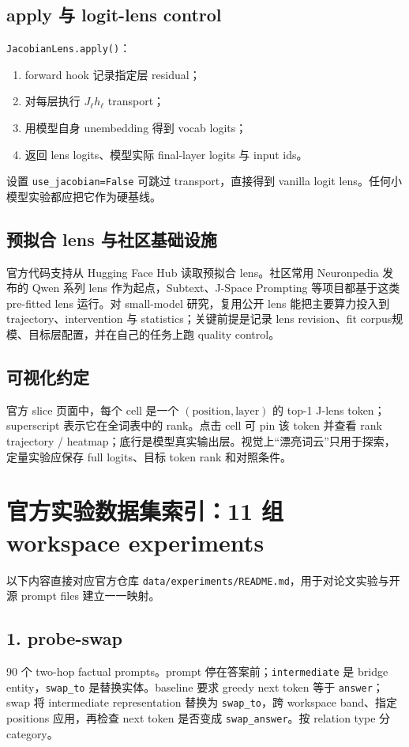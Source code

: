 \documentclass[10.5pt,a4paper]{ctexart}
\begin{document}
\subsection{apply 与 logit-lens control}
\texttt{JacobianLens.apply()}：
\begin{enumerate}
  \item forward hook 记录指定层 residual；
  \item 对每层执行 \(J_\ell h_\ell\) transport；
  \item 用模型自身 unembedding 得到 vocab logits；
  \item 返回 lens logits、模型实际 final-layer logits 与 input ids。
\end{enumerate}
设置 \texttt{use\_jacobian=False} 可跳过 transport，直接得到 vanilla logit lens。任何小模型实验都应把它作为硬基线。


\subsection{预拟合 lens 与社区基础设施}
官方代码支持从 Hugging Face Hub 读取预拟合 lens。社区常用 Neuronpedia 发布的 Qwen 系列 lens 作为起点，Subtext、J-Space Prompting 等项目都基于这类 pre-fitted lens 运行。对 small-model 研究，复用公开 lens 能把主要算力投入到 trajectory、intervention 与 statistics；关键前提是记录 lens revision、fit corpus规模、目标层配置，并在自己的任务上跑 quality control。

\subsection{可视化约定}
官方 slice 页面中，每个 cell 是一个 \((\mathrm{position},\mathrm{layer})\) 的 top-1 J-lens token；superscript 表示它在全词表中的 rank。点击 cell 可 pin 该 token 并查看 rank trajectory / heatmap；底行是模型真实输出层。视觉上“漂亮词云”只用于探索，定量实验应保存 full logits、目标 token rank 和对照条件。

\section{官方实验数据集索引：11 组 workspace experiments}
以下内容直接对应官方仓库 \texttt{data/experiments/README.md}，用于对论文实验与开源 prompt files 建立一一映射。

\subsection{1. probe-swap}
90 个 two-hop factual prompts。prompt 停在答案前；\texttt{intermediate} 是 bridge entity，\texttt{swap\_to} 是替换实体。baseline 要求 greedy next token 等于 \texttt{answer}；swap 将 intermediate representation 替换为 \texttt{swap\_to}，跨 workspace band、指定 positions 应用，再检查 next token 是否变成 \texttt{swap\_answer}。按 relation type 分 category。
\end{document}
